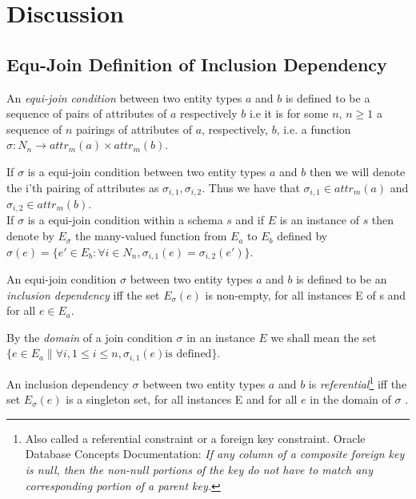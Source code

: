 \documentclass[10pt,a4paper]{article}
\newcommand{\commentary}[1]{\marginpar{\footnotesize #1}}
\newcommand{\genericmodel}{\mathcal{M}}
\renewcommand{\genericmodel}{{m}}
\newcommand{\attr}[2] [\genericmodel]{attr_{#1}(#2)}
\newcommand{\term}[1]{\textit{{#1}}}
\begin{document}
\section{Discussion}

\subsection{Equ-Join Definition of Inclusion Dependency}
\begin{definition}
\noindent An \term{equi-join condition} between two entity types $a$ and $b$ is defined to be a sequence of pairs of attributes of 
 $a$ respectively $b$ i.e it is for some $n$, $n \geq 1$ a sequence of $n$ pairings of attributes of $a$, respectively, $b$, i.e. a function $\sigma: N_n \rightarrow \attr{a} \times \attr{b}$. \\
\end{definition}

\noindent If $\sigma$ is a equi-join condition between two entity types $a$ and $b$ then we will denote the i'th pairing of attributes as $\sigma_{i,1},\sigma_{i,2}$. 
Thus we have that  $\sigma_{i,1} \in \attr{a}$ and $\sigma_{i,2} \in \attr{b}$. \\

\noindent If $\sigma$ is a equi-join condition within a schema $s$\commentary{ model $M$?} and if $E$ is an instance of $s$ then denote by $E_\sigma$
the many-valued function from $E_a$ to $E_b$
defined by $\sigma(e) = \{ e' \in E_b : \forall i \in N_n, \sigma_{i,1}(e)=\sigma_{i,2}(e') \}$. \\

\begin{definition}
An equi-join condition  $\sigma$ between two entity types $a$ and $b$ is defined to be an 
\term{inclusion dependency}
iff the set $E_\sigma(e)$ is non-empty, for all instances E of s\commentary{ wherefore $s$?} and for all $e \in E_a$. \\
\end{definition}

\noindent
By the \term{domain} of a join condition $\sigma$ in an instance $E$ we shall mean the  set $\{ e \in E_a \| \forall i, 1 \leq i \leq n, \sigma_{i,1}(e) \mbox{is defined} \}$. \\


\begin{definition}
An inclusion dependency $\sigma$ between two entity types $a$ and $b$ is 
\term{referential}\footnote{Also called a referential constraint or a foreign key constraint. Oracle Database Concepts Documentation: \textit{If any column of a composite foreign key is null, then the non-null portions of the key do not have to match any corresponding portion of a parent key.}  } 
iff the set $E_\sigma(e)$ is a singleton set, for all instances E and for all $e$ in the domain of  $\sigma$ . 
\end{definition}
\end{document}
